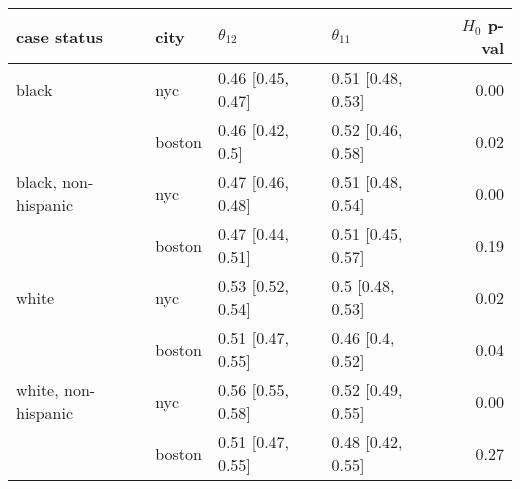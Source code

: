 \begin{tabular}{llllr}
  \hline
case status & city & $\theta_{12}$ & $\theta_{11}$ & $H_{0}$ p-val \\ 
  \hline
black & nyc & 0.46 [0.45, 0.47] & 0.51 [0.48, 0.53] & 0.00 \\ 
   & boston & 0.46 [0.42, 0.5] & 0.52 [0.46, 0.58] & 0.02 \\ 
  black, non-hispanic & nyc & 0.47 [0.46, 0.48] & 0.51 [0.48, 0.54] & 0.00 \\ 
   & boston & 0.47 [0.44, 0.51] & 0.51 [0.45, 0.57] & 0.19 \\ 
  white & nyc & 0.53 [0.52, 0.54] & 0.5 [0.48, 0.53] & 0.02 \\ 
   & boston & 0.51 [0.47, 0.55] & 0.46 [0.4, 0.52] & 0.04 \\ 
  white, non-hispanic & nyc & 0.56 [0.55, 0.58] & 0.52 [0.49, 0.55] & 0.00 \\ 
   & boston & 0.51 [0.47, 0.55] & 0.48 [0.42, 0.55] & 0.27 \\ 
   \hline
\end{tabular}
